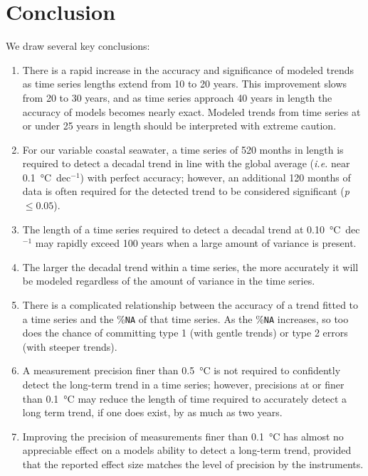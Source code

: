 \documentclass[]{ametsoc}
\begin{document}
\section{Conclusion}
We draw several key conclusions:

\begin{enumerate}
\item There is a rapid increase in the accuracy and significance of modeled trends as time series lengths extend from 10 to 20 years. This improvement slows from 20 to 30 years, and as time series approach 40 years in length the accuracy of models becomes nearly exact. Modeled trends from time series at or under 25 years in length should be interpreted with extreme caution.

\item For our variable coastal seawater, a time series of 520 months in length is required to detect a decadal trend in line with the global average (\emph{i.e.} near \SI{0.1}{\degreeCelsius}~dec$^{-1}$) with perfect accuracy; however, an additional 120 months of data is often required for the detected trend to be considered significant (\emph{p} $\leq 0.05$).

\item The length of a time series required to detect a decadal trend at \SI{0.10}{\degreeCelsius}~dec$^{-1}$ may rapidly exceed 100 years when a large amount of variance is present.

\item The larger the decadal trend within a time series, the more accurately it will be modeled regardless of the amount of variance in the time series.

\item There is a complicated relationship between the accuracy of a trend fitted to a time series and the \%\texttt{NA} of that time series. As the \%\texttt{NA} increases, so too does the chance of committing type 1 (with gentle trends) or type 2 errors (with steeper trends).

\item A measurement precision finer than \SI{0.5}{\degreeCelsius} is not required to confidently detect the long-term trend in a time series; however, precisions at or finer than \SI{0.1}{\degreeCelsius} may reduce the length of time required to accurately detect a long term trend, if one does exist, by as much as two years.

\item Improving the precision of measurements finer than \SI{0.1}{\degreeCelsius} has almost no appreciable effect on a models ability to detect a long-term trend, provided that the reported effect size matches the level of precision by the instruments.
\end{enumerate}
\end{document}
